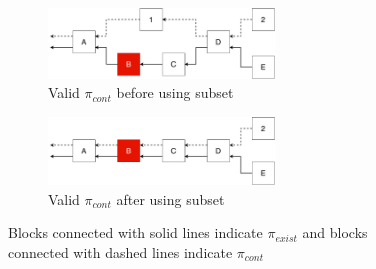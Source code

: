 \begin{figure}[ht]
\begin{subfigure}{.5\textwidth}
  \centering
  \includegraphics[width=6cm]{../images/Subset_1.pdf}
  \caption{Valid $\pi_{cont}$ before using subset}
  \label{figure:DAG_usage}
\end{subfigure}
\begin{subfigure}{.5\textwidth}
  \centering
  \includegraphics[width=6cm]{../images/Subset_2.pdf}
  \caption{Valid $\pi_{cont}$ after using subset}
  \label{figure:DAG_usage}
\end{subfigure}
\caption{Blocks connected with solid lines indicate $\pi_{exist}$ and blocks
connected with dashed lines indicate $\pi_{cont}$}
\label{fig:fig}
\end{figure}
